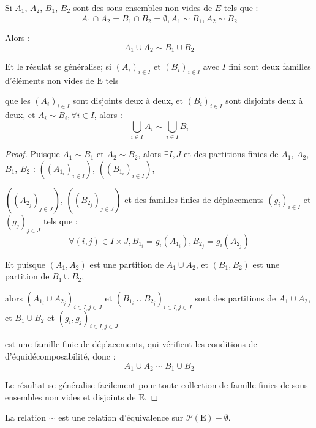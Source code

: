 \begin{prop}\label{prop9}
  \hfill

  Si $A_1$, $A_2$, $B_1$, $B_2$ sont des sous-ensembles non vides de $E$ tels que :
  $$A_1\cap A_2=B_1 \cap B_2 = \emptyset, A_1 \sim B_1, A_2 \sim B_2$$\par
  Alors : $$A_1 \cup A_2 \sim B_1 \cup B_2$$\par
  Et le résulat se généralise; si $(A_i)_{i\in I}$ et $(B_i)_{i\in I}$ avec $I$ fini sont deux familles d'éléments non vides de $\mathrm{E}$ tels \par que les $(A_i)_{i\in I}$ sont disjoints deux à deux, et $(B_i)_{i\in I}$ sont disjoints deux à deux, et $A_i \sim B_i, \forall i \in I$, alors : $$\underset{i \in I}{\bigcup} A_i \sim \underset{i \in I}{\bigcup} B_i$$ \par
\end{prop}
\begin{proof}
  \hfill

  Puisque $A_1 \sim B_1$ et $A_2 \sim B_2$, alors $\exists I, J$ et des partitions finies de $A_1$, $A_2$, $B_1$, $B_2$ :
  $((A_{1_i})_{i \in I})$, $((B_{1_i})_{i \in I})$, \par $((A_{2_j})_{j \in J})$, $((B_{2_j})_{j \in J})$ et des familles finies de déplacements $(g_i)_{i\in I}$ et $(g_j)_{j \in J}$ tels que :$$\forall (i,j) \in I\times J, B_{1_i} = g_i(A_{1_i}), B_{2_j} = g_i(A_{2_j})$$\par
  Et puisque $(A_1, A_2)$ est une partition de $A_1\cup A_2$, et $(B_1, B_2)$ est une partition de $B_1\cup B_2$,\par alors
  $(A_{1_i} \cup A_{2_j})_{i \in I, j \in J}$ et $(B_{1_i}\cup B_{2_j})_{i \in I, j \in J}$ sont des partitions de  $A_1\cup A_2$, et $B_1\cup B_2$ et $(g_i, g_j)_{i \in I, j \in J}$ \par est une famille finie de déplacements, qui vérifient les conditions de d'équidécomposabilité, donc : $$A_1 \cup A_2 \sim B_1 \cup B_2$$ \par
  Le résultat se généralise facilement pour toute collection de famille finies de sous ensembles non vides et disjoints de $\mathrm{E}$.
\end{proof}
\begin{lemma}\label{lemme18}
  La relation $\sim$ est une relation d'équivalence sur $\mathcal{P}(\mathrm{E})-{\emptyset}$.
\end{lemma}

